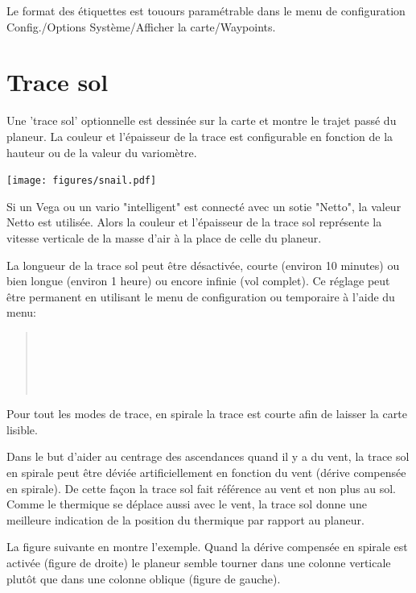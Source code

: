 Le format des étiquettes est touours paramétrable dans le menu de configuration Config./Options Système/Afficher la carte/Waypoints. 

\section{Trace sol}\label{sec:trail}

Une 'trace sol' optionnelle est dessinée sur la carte et montre le trajet passé du planeur. La couleur et l'épaisseur de la trace est configurable en fonction de la hauteur ou de la valeur du variomètre.  

\begin{center}
\texttt{[image: figures/snail.pdf]}
\end{center}

Si un Vega ou un vario "intelligent" est connecté avec un sotie "Netto", la valeur Netto est utilisée. Alors la couleur et l'épaisseur de la trace sol représente la vitesse verticale de la masse d'air à la place de celle du planeur.

La longueur de la trace sol peut être désactivée, courte (environ 10 minutes) ou bien longue (environ 1 heure) ou encore infinie (vol complet). Ce réglage peut être permanent en utilisant le menu de configuration  ou temporaire à l'aide du menu:
\begin{quote}
\blink{} \\
\blink{} \\
\blink{} \\
\blink{} \\
\blink{}
\end{quote}

Pour tout les modes de trace, en spirale la trace est courte afin de laisser la carte lisible.

Dans le but d'aider au centrage des ascendances quand il y a du vent, la trace sol en spirale peut être déviée artificiellement en fonction du vent (dérive compensée en spirale). De cette façon la trace sol fait référence au vent et non plus au sol. Comme le thermique se déplace aussi avec le vent, la trace sol donne une meilleure indication de la position du thermique par rapport au planeur.

La figure suivante en montre l'exemple. Quand la dérive compensée en spirale est activée (figure de droite) le planeur semble tourner dans une colonne verticale plutôt que dans une colonne oblique (figure de gauche).

